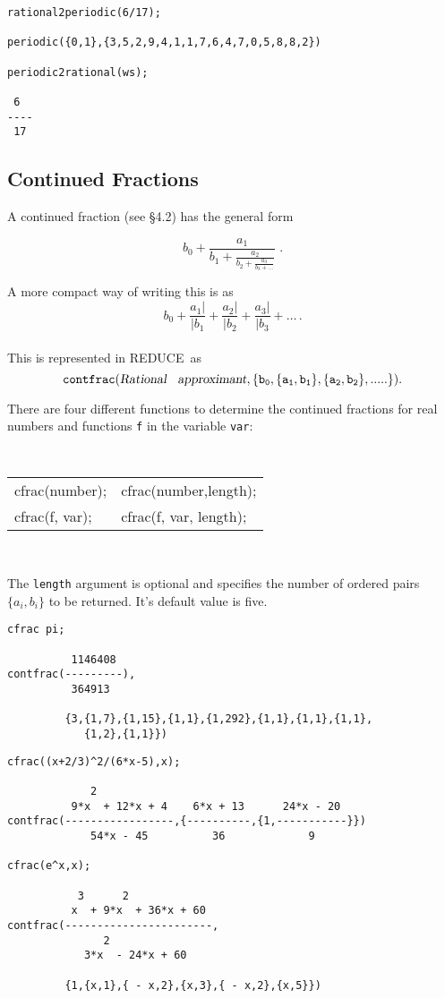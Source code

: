 \documentclass[11pt,letterpaper]{book}
\makeatletter
\newcommand{\REDUCE}{REDUCE}
\newcommand{\underscore}{\_}
\newcommand{\ttindex}[1]{{\renewcommand{\_}{\protect\underscore}%
                          \index{#1@{\tt #1}}}}
\makeatother
\begin{document}
{\small\begin{verbatim}
rational2periodic(6/17);

periodic({0,1},{3,5,2,9,4,1,1,7,6,4,7,0,5,8,8,2})

periodic2rational(ws);

 6
----
 17

\end{verbatim}}


\subsection{Continued Fractions}

A continued fraction (see \cite{Baker:81a} \S 4.2) has the general form

\[b_0 + \frac{a_1}{b_1 +
         \frac{a_2}{b_2+
          \frac{a_3}{b_3 + \ldots
        }}}
\;.\]


A more compact way of writing this is as
\[b_0 + \frac{a_1|}{|b_1} + \frac{a_2|}{|b_2} + \frac{a_3|}{|b_3} + \ldots\,.\]
\\

This is represented in \REDUCE\ as
\[{\tt
   contfrac({\mbox{\sl Rational\hspace{2mm} approximant}},
                \{b_0, \{a_1,b_1\}, \{a_2,b_2\},.....\}).\ttindex{CONTFRAC}
}\]

There are four different functions to determine the continued fractions
for real numbers and functions {\tt f} in the variable {\tt var}:
\begin{center}
{\tt
\begin{tabular}{l l}
cfrac(number); & cfrac(number,length); \\
cfrac(f, var); & cfrac(f, var, length);
\end{tabular}} \\[1mm]
\end{center}
\ttindex{CFRAC}

The {\tt length} argument is optional and specifies the number of
ordered pairs $\{a_i,b_i\}$ to be returned. It's default value is five.

{\small\begin{verbatim}
cfrac pi;

          1146408
contfrac(---------),
          364913

         {3,{1,7},{1,15},{1,1},{1,292},{1,1},{1,1},{1,1},
            {1,2},{1,1}})
\end{verbatim}}
\newpage
{\small\begin{verbatim}
cfrac((x+2/3)^2/(6*x-5),x);

             2
          9*x  + 12*x + 4    6*x + 13      24*x - 20
contfrac(-----------------,{----------,{1,-----------}})
             54*x - 45          36             9

cfrac(e^x,x);

           3      2
          x  + 9*x  + 36*x + 60
contfrac(-----------------------,
               2
            3*x  - 24*x + 60
        
         {1,{x,1},{ - x,2},{x,3},{ - x,2},{x,5}})
\end{verbatim}}
\end{document}
